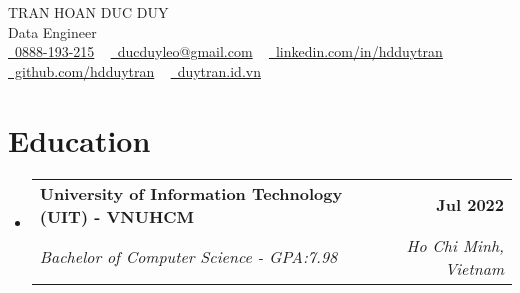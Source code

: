 \documentclass[letterpaper,11pt]{article}
\makeatletter
\newcommand{\resumeSubheading}[4]{
  \vspace{-2pt}\item
    \begin{tabular*}{1.0\textwidth}[t]{l@{\extracolsep{\fill}}r}
      \textbf{#1} & \textbf{\small #2} \\
      \textit{\small#3} & \textit{\small #4} \\
    \end{tabular*}\vspace{-7pt}
}
\newcommand{\resumeSubHeadingListStart}{\begin{itemize}[leftmargin=0.0in, label={}]}
\newcommand{\resumeSubHeadingListEnd}{\end{itemize}}
\makeatother
\begin{document}

\begin{center}
    {\Huge \scshape TRAN HOAN DUC DUY} \\ \vspace{5pt}
    {\Huge Data Engineer} \\ \vspace{3pt}
    \small \href{tel:0888193215}{\raisebox{-0.1\height}\faPhone\ 0888-193-215} ~ \href{mailto:ducduyleo@gmail.com}{\raisebox{-0.2\height}\faEnvelope\  ducduyleo@gmail.com} ~ 
    \href{https://linkedin.com/in/hdduytran/}{\raisebox{-0.2\height}\faLinkedin\ linkedin.com/in/hdduytran}  ~
    \href{https://github.com/hdduytran}{\raisebox{-0.2\height}\faGithub\ github.com/hdduytran} ~
    \href{https://duytran.id.vn}{\raisebox{-0.2\height}\faGlobe\ duytran.id.vn} ~
\end{center}



\section{Education}
  \resumeSubHeadingListStart
    \resumeSubheading
      {University of Information Technology (UIT) - VNUHCM}{Jul 2022}
      {Bachelor of Computer Science - GPA:7.98}{Ho Chi Minh, Vietnam}
  \resumeSubHeadingListEnd

\end{document}
